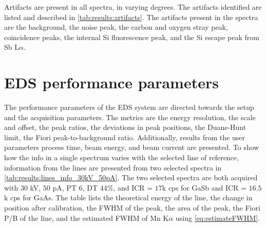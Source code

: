 Artifacts are present in all spectra, in varying degrees.
The artifacts identified are listed and described in \cref{tab:results:artifacts}.
The artifacts present in the spectra are the background, the noise peak, the carbon and oxygen stray peak, coincidence peaks, the internal Si fluorescence peak, and the Si escape peak from Sb L$\alpha$.





























\section{EDS performance parameters}
\label{results:performance}

The performance parameters of the EDS system are directed towards the setup and the acquisition parameters.
The metrics are the energy resolution, the scale and offset, the peak ratios, the deviations in peak positions, the Duane-Hunt limit, the Fiori peak-to-background ratio.
Additionally, results from the user parameters process time, beam energy, and beam current are presented.
To show how the info in a single spectrum varies with the selected line of reference, information from the lines are presented from two selected spectra in \cref{tab:results:lines_info_30kV_50pA}.
The two selected spectra are both acquired with $30$ kV, $50$ pA, PT $6$, DT $44$\%, and ICR = $17$k cps for GaSb and ICR = $16.5$k cps for GaAs.
The table lists the theoretical energy of the line, the change in position after calibration, the FWHM of the peak, the area of the peak, the Fiori P/B of the line, and the estimated FWHM of Mn K$\alpha$ using \cref{eq:estimateFWHM}.


